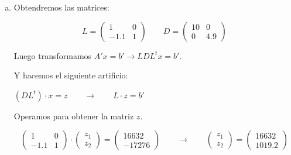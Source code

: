 \begin{frame}
	\begin{solution}
		\begin{enumerate}[d)]
			\item Obtendremos las matrices:

			      \begin{equation*}
				      L=
				      \begin{pmatrix}
					      1    & 0 \\
					      -1.1 & 1
				      \end{pmatrix}
				      \qquad
				      D=
				      \begin{pmatrix}
					      10 & 0   \\
					      0  & 4.9
				      \end{pmatrix}
			      \end{equation*}

			      Luego transformamos $A'x=b' \longrightarrow LDL^{t}x=b'$.

			      Y hacemos el siguiente artificio:

			      $(DL^{t})\cdot x=z \qquad \longrightarrow \qquad L\cdot z=b'$

			      Operamos para obtener la matriz $z$.

			      \begin{equation*}
				      \begin{pmatrix}
					      1    & 0 \\
					      -1.1 & 1
				      \end{pmatrix}
				      \cdot
				      \begin{pmatrix}
					      z_{1} \\
					      z_{2}
				      \end{pmatrix}
				      =
				      \begin{pmatrix}
					      16632 \\
					      -17276
				      \end{pmatrix}
				      \qquad
				      \longrightarrow
				      \qquad
				      \begin{pmatrix}
					      z_{1} \\
					      z_{2}
				      \end{pmatrix}
				      =
				      \begin{pmatrix}
					      16632 \\
					      1019.2
				      \end{pmatrix}
			      \end{equation*}


\end{enumerate}
\end{solution}
\end{frame}
